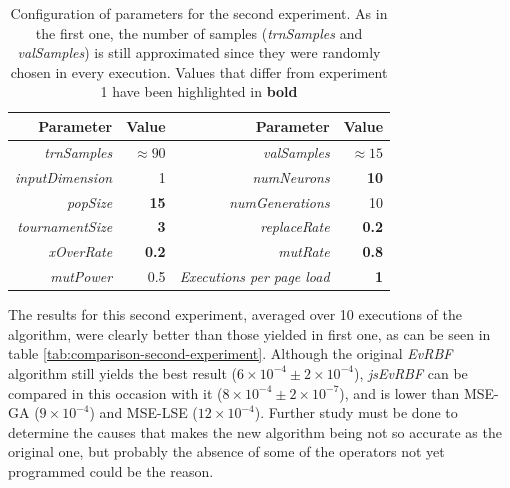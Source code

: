 \documentclass{article}
\begin{document}
\setlength{\tabcolsep}{10pt}
\begin{table}
\caption{Configuration of parameters for the second experiment. As in the first one, the number of samples ({\em trnSamples} and {\em valSamples}) is still approximated since they were randomly chosen in every execution. Values that differ from experiment 1 have been highlighted in {\bf bold}}
\label{tab:parameters-second-experiment}
\begin{center}
\begin{tabular}{rr|rr}
{\bf Parameter} & {\bf Value} &
{\bf Parameter} & {\bf Value}\\
\hline
{\em trnSamples} & $\approx 90$ &
{\em valSamples} & $\approx 15$  \\
{\em inputDimension} &   1 &
{\em numNeurons} &  {\bf 10} \\
{\em popSize} &  {\bf 15} &
{\em numGenerations} & 10  \\
{\em tournamentSize} &  {\bf 3} &
{\em replaceRate} &   {\bf 0.2} \\
{\em xOverRate} &  {\bf 0.2}&
{\em mutRate} &   {\bf 0.8}  \\
{\em mutPower} &  0.5 &
{\em Executions per page load} &  {\bf 1} \\
\hline
\end{tabular}
\end{center}
\end{table}

The results for this second experiment, averaged over 10 executions of the algorithm, were clearly better than those yielded in first one, as can be seen in table \ref{tab:comparison-second-experiment}. Although the original {\em EvRBF} algorithm still yields the best result ($6 \times 10^{-4} \pm 2 \times 10^{-4}$), {\em jsEvRBF} can be compared in this occasion with it ($8 \times 10^{-4} \pm 2 \times 10^{-7}$), and is lower than MSE-GA ($9 \times 10^{-4}$) and MSE-LSE ($12 \times 10^{-4}$). Further study must be done to determine the causes that makes the new algorithm being not so accurate as the original one, but probably the absence of some of the operators not yet programmed could be the reason.
\end{document}
